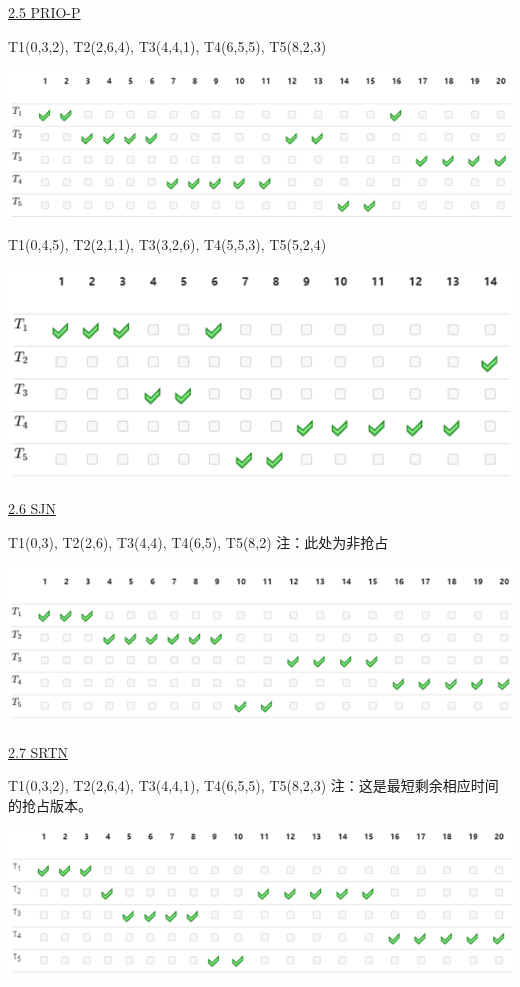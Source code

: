 \documentclass[fleqn]{article}
\begin{document}
\noindent\uline{2.5 PRIO-P}

T1(0,3,2), T2(2,6,4), T3(4,4,1), T4(6,5,5), T5(8,2,3)

\begin{center}
    \includegraphics{11.png}
\end{center}

T1(0,4,5), T2(2,1,1), T3(3,2,6), T4(5,5,3), T5(5,2,4)

\begin{center}
    \includegraphics{12.png}
\end{center}

\noindent\uline{2.6 SJN}

T1(0,3), T2(2,6), T3(4,4), T4(6,5), T5(8,2)
注：此处为非抢占

\begin{center}
    \includegraphics{13.png}
\end{center}

\noindent\uline{2.7 SRTN}

T1(0,3,2), T2(2,6,4), T3(4,4,1), T4(6,5,5), T5(8,2,3)
注：这是最短剩余相应时间的抢占版本。

\begin{center}
    \includegraphics{14.png}
\end{center}
\end{document}
